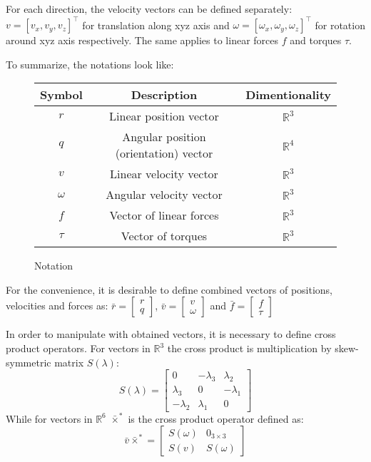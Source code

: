     For each direction, the velocity vectors can be defined separately: 
    $v = [v_x, v_y, v_z]^\top$ for translation along xyz axis and
    $\omega = [\omega_x, \omega_y, \omega_z]^\top$ for rotation around xyz axis respectively.
    The same applies to linear forces $f$ and torques $\tau$.

    To summarize, the notations look like:

    \begin{figure}[H]
    \begin{tabular}{ccc}
        \hline Symbol & Description & Dimentionality\\
        \hline
        $r$ & Linear position vector & $\mathbb{R}^{3}$ \\
        $q$ & Angular position (orientation) vector & $\mathbb{R}^{4}$\\
        $v$ & Linear velocity vector & $\mathbb{R}^{3}$\\
        $\omega$ & Angular velocity vector & $\mathbb{R}^{3}$\\
        $f$ & Vector of linear forces& $\mathbb{R}^{3}$ \\
        $\tau$ & Vector of torques& $\mathbb{R}^{3}$ \\
        \hline
        \end{tabular}
        \caption{Notation}
        \label{table:notation}
    \end{figure}

    For the convenience, it is desirable to define combined vectors of positions, velocities and forces as:
    $\bar{r} = \left[\begin{array}{ll}
        r \\
        q
    \end{array}\right]$, $\bar{v} = \left[\begin{array}{ll}
        v \\
        \omega
    \end{array}\right]$ and $\bar{f} = \left[\begin{array}{ll}
        f \\
        \tau
    \end{array}\right]$

    In order to manipulate with obtained vectors, it is necessary to define cross product operators.
    For vectors in $\mathbb{R}^{3}$ the cross product is multiplication by skew-symmetric matrix $S(\lambda)$:
    $$
    S(\lambda)=\left[\begin{array}{ccc}
        0 & -\lambda_3 & \lambda_2 \\
        \lambda_3 & 0 & -\lambda_1 \\
        -\lambda_2 & \lambda_1 & 0
    \end{array}\right]
    $$
    While for vectors in $\mathbb{R}^{6}$ $\bar{\times}^*$ is the cross product operator defined as:
    $$
    \bar{v}\bar{\times}^*=\left[\begin{array}{ll}
        S(\omega) & 0_{3 \times 3} \\
        S(v) & S(\omega)
    \end{array}\right]
    $$

